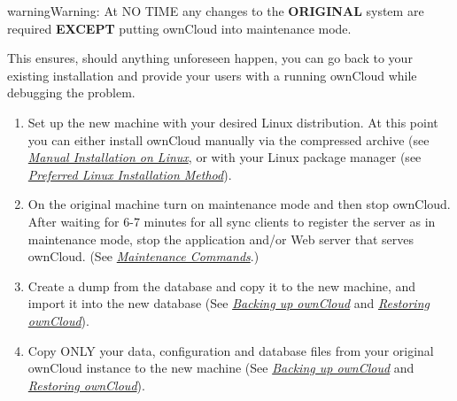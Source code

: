 \documentclass[letterpaper,10pt,english]{sphinxmanual}
\begin{document}
\begin{notice}{warning}{Warning:}
At NO TIME any changes to the \textbf{ORIGINAL} system are required
\textbf{EXCEPT} putting ownCloud into maintenance mode.

This ensures, should anything unforeseen happen, you can go
back to your existing installation and provide your users
with a running ownCloud while debugging the problem.
\end{notice}
\begin{enumerate}
\item {} 
Set up the new machine with your desired Linux distribution. At this point you can either install ownCloud manually via the compressed archive (see {\hyperref[installation/source_installation::doc]{\emph{Manual Installation on Linux}}}, or with your Linux package manager (see {\hyperref[installation/linux_installation::doc]{\emph{Preferred Linux Installation Method}}}).

\item {} 
On the original machine turn on maintenance mode and then stop ownCloud. After waiting for 6-7 minutes for all sync clients to register the server as in maintenance mode, stop the application and/or Web server that serves ownCloud. (See {\hyperref[configuration_server/occ_command:maintenance-commands-label]{\emph{Maintenance Commands}}}.)

\item {} 
Create a dump from the database and copy it to the new machine, and import it into the new database (See {\hyperref[maintenance/backup::doc]{\emph{Backing up ownCloud}}} and {\hyperref[maintenance/restore::doc]{\emph{Restoring ownCloud}}}).

\item {} 
Copy ONLY your data, configuration and database files from your original ownCloud instance to the new machine (See {\hyperref[maintenance/backup::doc]{\emph{Backing up ownCloud}}} and {\hyperref[maintenance/restore::doc]{\emph{Restoring ownCloud}}}).

\end{enumerate}
\end{document}
